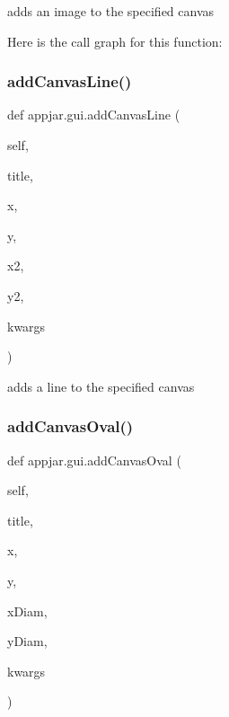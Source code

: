 \begin{DoxyVerb}adds an image to the specified canvas \end{DoxyVerb}
 Here is the call graph for this function\+:
\mbox{\label{classappjar_1_1gui_a0be7617ccf839c8f7d0e171c77e81172}} 
\subsubsection{\texorpdfstring{add\+Canvas\+Line()}{addCanvasLine()}}
{\footnotesize\ttfamily def appjar.\+gui.\+add\+Canvas\+Line (\begin{DoxyParamCaption}\item[{}]{self,  }\item[{}]{title,  }\item[{}]{x,  }\item[{}]{y,  }\item[{}]{x2,  }\item[{}]{y2,  }\item[{}]{kwargs }\end{DoxyParamCaption})}

\begin{DoxyVerb}adds a line to the specified canvas \end{DoxyVerb}
 \mbox{\label{classappjar_1_1gui_a1ae6c2caa5a92980273d7d5397de8473}} 
\subsubsection{\texorpdfstring{add\+Canvas\+Oval()}{addCanvasOval()}}
{\footnotesize\ttfamily def appjar.\+gui.\+add\+Canvas\+Oval (\begin{DoxyParamCaption}\item[{}]{self,  }\item[{}]{title,  }\item[{}]{x,  }\item[{}]{y,  }\item[{}]{x\+Diam,  }\item[{}]{y\+Diam,  }\item[{}]{kwargs }\end{DoxyParamCaption})}

